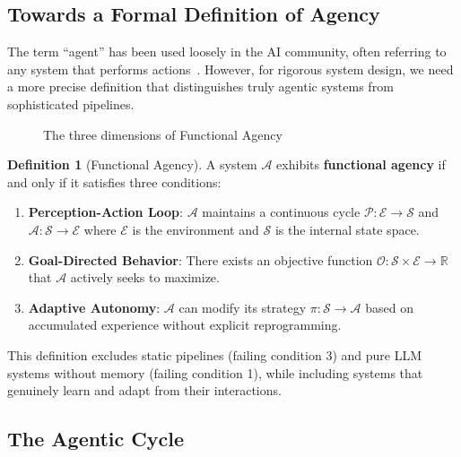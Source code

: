 \documentclass[11pt,a4paper]{article}
\theoremstyle{definition}
\newtheorem{definition}{Definition}[section]
\theoremstyle{remark}
\begin{document}
\subsection{Towards a Formal Definition of Agency}

The term ``agent'' has been used loosely in the AI community, often referring to any system that performs actions~\cite{wooldridge1995intelligent}. However, for rigorous system design, we need a more precise definition that distinguishes truly agentic systems from sophisticated pipelines.

\begin{figure}[H]
    \centering
    
    \caption{The three dimensions of Functional Agency}
    \label{fig:functional-agency}
\end{figure}

\begin{definition}[Functional Agency]
\label{def:functional-agency}
A system $\mathcal{A}$ exhibits \textbf{functional agency} if and only if it satisfies three conditions:

\begin{enumerate}
    \item \textbf{Perception-Action Loop}: $\mathcal{A}$ maintains a continuous cycle $\mathcal{P}: \mathcal{E} \rightarrow \mathcal{S}$ and $\mathcal{A}: \mathcal{S} \rightarrow \mathcal{E}$ where $\mathcal{E}$ is the environment and $\mathcal{S}$ is the internal state space.

    \item \textbf{Goal-Directed Behavior}: There exists an objective function $\mathcal{O}: \mathcal{S} \times \mathcal{E} \rightarrow \mathbb{R}$ that $\mathcal{A}$ actively seeks to maximize.

    \item \textbf{Adaptive Autonomy}: $\mathcal{A}$ can modify its strategy $\pi: \mathcal{S} \rightarrow \mathcal{A}$ based on accumulated experience without explicit reprogramming.
\end{enumerate}
\end{definition}

This definition excludes static pipelines (failing condition 3) and pure LLM systems without memory (failing condition 1), while including systems that genuinely learn and adapt from their interactions.

\subsection{The Agentic Cycle}
\end{document}
